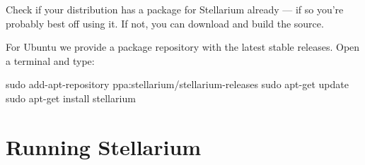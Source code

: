 Check if your distribution has a package for Stellarium already --- if
so you're probably best off using it. If not, you can download and build
the source.

For Ubuntu we provide a package repository with the latest stable
releases. Open a terminal and type:

\begin{commands}
sudo add-apt-repository ppa:stellarium/stellarium-releases
sudo apt-get update
sudo apt-get install stellarium
\end{commands}


\section{Running Stellarium}
\label{sec:GettingStarted:Running}

